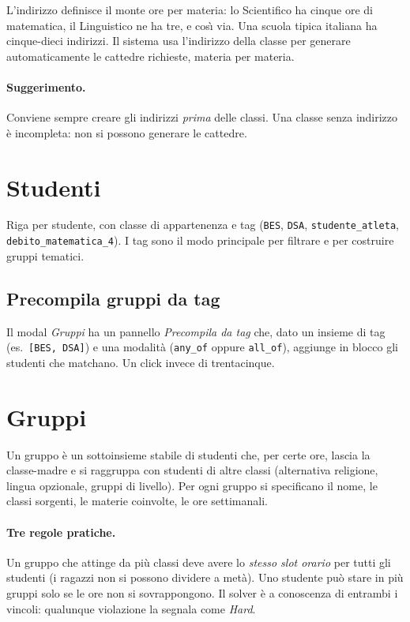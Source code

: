 L'indirizzo definisce il monte ore per materia: lo Scientifico
ha cinque ore di matematica, il Linguistico ne ha tre, e cos\`{\i}
via. Una scuola tipica italiana ha cinque-dieci indirizzi. Il
sistema usa l'indirizzo della classe per generare
automaticamente le cattedre richieste, materia per materia.

\paragraph{Suggerimento.} Conviene sempre creare gli indirizzi
\emph{prima} delle classi. Una classe senza indirizzo \`e
incompleta: non si possono generare le cattedre.

\section{Studenti}
\label{sec:tab_studenti}

Riga per studente, con classe di appartenenza e tag
(\texttt{BES}, \texttt{DSA}, \texttt{studente\_atleta},
\texttt{debito\_matematica\_4}). I tag sono il modo principale
per filtrare e per costruire gruppi tematici.

\subsection{Precompila gruppi da tag}

Il modal \emph{Gruppi} ha un pannello \emph{Precompila da tag}
che, dato un insieme di tag (es.\ \texttt{[BES, DSA]}) e una
modalit\`a (\texttt{any\_of} oppure \texttt{all\_of}), aggiunge
in blocco gli studenti che matchano. Un click invece di
trentacinque.

\section{Gruppi}
\label{sec:tab_gruppi}

Un gruppo \`e un sottoinsieme stabile di studenti che, per certe
ore, lascia la classe-madre e si raggruppa con studenti di
altre classi (alternativa religione, lingua opzionale, gruppi di
livello). Per ogni gruppo si specificano il nome, le classi
sorgenti, le materie coinvolte, le ore settimanali.

\paragraph{Tre regole pratiche.} Un gruppo che attinge da pi\`u
classi deve avere lo \emph{stesso slot orario} per tutti gli
studenti (i ragazzi non si possono dividere a met\`a). Uno
studente pu\`o stare in pi\`u gruppi solo se le ore non si
sovrappongono. Il solver \`e a conoscenza di entrambi i vincoli:
qualunque violazione la segnala come \emph{Hard}.

